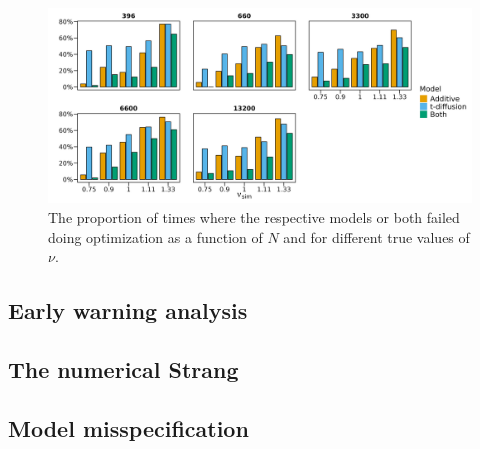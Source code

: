 \begin{figure}[h!]
    \begin{center}
        \includegraphics[scale = .1]{figures/error_count_plot.jpeg}
        \caption{The proportion of times where the respective models or both failed doing optimization as a function of $N$ and for different true values of $\nu$.}
        \label{figure:error_count_nu_experiment}
    \end{center}
\end{figure}

\subsection{Early warning analysis}

\subsection{The numerical Strang}

\subsection{Model misspecification}